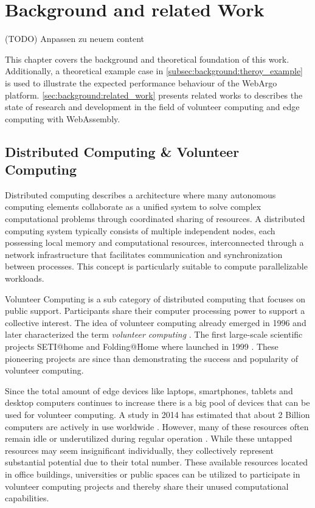 \chapter{Background and related Work}
\label{ch:background}
(TODO) Anpassen zu neuem content

This chapter covers the background and theoretical foundation of this work. Additionally, a theoretical example case in \autoref{subsec:background:theroy_example} is used to illustrate the expected performance behaviour of the WebArgo platform. \autoref{sec:background:related_work} presents related works to describes the state of research and development in the field of volunteer computing and edge computing with WebAssembly.

\section{Distributed Computing \& Volunteer Computing}
Distributed computing describes a architecture where many autonomous computing elements collaborate as a unified system to solve complex computational problems through coordinated sharing of resources. A distributed computing system typically consists of multiple independent nodes, each possessing local memory and computational resources, interconnected through a network infrastructure that facilitates communication and synchronization between processes. This concept is particularly suitable to compute parallelizable workloads.

Volunteer Computing is a sub category of distributed computing that focuses on public support. Participants share their computer processing power to support a collective interest. The idea of volunteer computing already emerged in 1996 \cite{relatedwork:boinc1} and \citeauthor{background:vcname} later characterized the term \emph{volunteer computing} \cite{background:vcname}. The first large-scale scientific projects SETI@home and Folding@Home where launched in 1999 \cite{relatedwork:boinc1,relatedwork:seti}. These pioneering projects are since than demonstrating the success and popularity of volunteer computing.

Since the total amount of edge devices like laptops, smartphones, tablets and desktop computers continues to increase \cite{background:amountdeviceses,relatedwork:boinc1} there is a big pool of devices that can be used for volunteer computing. A study in 2014 has estimated that about 2 Billion computers are actively in use worldwide \cite{intro:computersAmount}. However, many of these resources often remain idle or underutilized during regular operation \cite{relatedwork:mobilecloud, relatedwork:wasmedgecomputing}. While these untapped resources may seem insignificant individually, they collectively represent substantial potential due to their total number. These available resources located in office buildings, universities or public spaces can be utilized to participate in volunteer computing projects and thereby share their unused computational capabilities.


